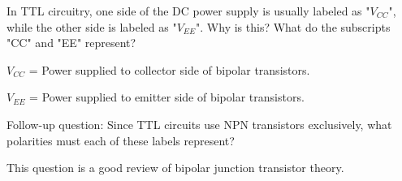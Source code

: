 

In TTL circuitry, one side of the DC power supply is usually labeled as "$V_{CC}$", while the other side is labeled as "$V_{EE}$".  Why is this?  What do the subscripts "CC" and "EE" represent?







$V_{CC}$ = Power supplied to collector side of bipolar transistors.

$V_{EE}$ = Power supplied to emitter side of bipolar transistors.

\vskip 10pt

Follow-up question: Since TTL circuits use NPN transistors exclusively, what polarities must each of these labels represent?







This question is a good review of bipolar junction transistor theory.




